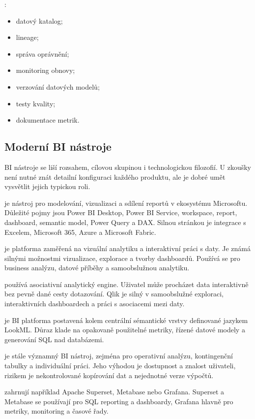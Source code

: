 :
\begin{itemize}
  \item datový katalog;
  \item lineage;
  \item správa oprávnění;
  \item monitoring obnovy;
  \item verzování datových modelů;
  \item testy kvality;
  \item dokumentace metrik.
\end{itemize}

\subsection{Moderní BI nástroje}
BI nástroje se liší rozsahem, cílovou skupinou i technologickou filozofií. U zkoušky není nutné znát detailní konfiguraci každého produktu, ale je dobré umět vysvětlit jejich typickou roli.

 je nástroj pro modelování, vizualizaci a sdílení reportů v ekosystému Microsoftu. Důležité pojmy jsou Power BI Desktop, Power BI Service, workspace, report, dashboard, semantic model, Power Query a DAX. Silnou stránkou je integrace s Excelem, Microsoft 365, Azure a Microsoft Fabric.

 je platforma zaměřená na vizuální analytiku a interaktivní práci s daty. Je známá silnými možnostmi vizualizace, explorace a tvorby dashboardů. Používá se pro business analýzu, datové příběhy a samoobslužnou analytiku.

 používá asociativní analytický engine. Uživatel může procházet data interaktivně bez pevně dané cesty dotazování. Qlik je silný v samoobslužné exploraci, interaktivních dashboardech a práci s asociacemi mezi daty.

 je BI platforma postavená kolem centrální sémantické vrstvy definované jazykem LookML. Důraz klade na opakovaně použitelné metriky, řízené datové modely a generování SQL nad databázemi.

 je stále významný BI nástroj, zejména pro operativní analýzu, kontingenční tabulky a individuální práci. Jeho výhodou je dostupnost a znalost uživateli, rizikem je nekontrolované kopírování dat a nejednotné verze výpočtů.

 zahrnují například Apache Superset, Metabase nebo Grafana. Superset a Metabase se používají pro SQL reporting a dashboardy, Grafana hlavně pro metriky, monitoring a časové řady.

